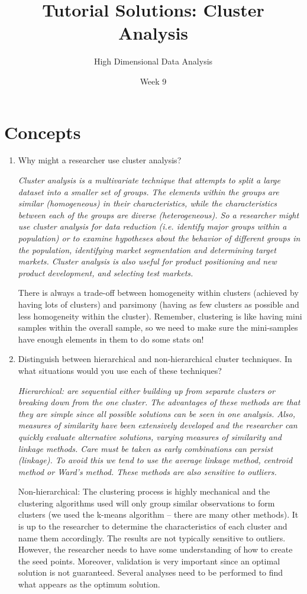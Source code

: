 \documentclass{article}
\title{Tutorial Solutions: Cluster Analysis}
\author{High Dimensional Data Analysis}
\date{Week 9}
\begin{document}
\maketitle
\section*{Concepts}
\begin{enumerate}
  \item Why might a researcher use cluster analysis?
  {\em
  Cluster analysis is a multivariate technique that attempts to split a large dataset into a smaller set of groups. The elements within the groups are similar (homogeneous) in their characteristics, while the characteristics between each of the groups are diverse (heterogeneous).  So a researcher might use cluster analysis for data reduction (i.e. identify major groups within a population) or to examine hypotheses about the behavior of different groups in the population, identifying market segmentation and determining target markets. Cluster analysis is also useful for product positioning and new product development, and selecting test markets.
  
  There is always a trade-off between homogeneity within clusters (achieved by having lots of clusters) and parsimony (having as few clusters as possible and less homogeneity within the cluster).   Remember, clustering is like having mini samples within the overall sample, so we need to make sure the mini-samples have enough elements in them to do some stats on!	 
  }
  \item Distinguish between hierarchical and non-hierarchical cluster techniques. In what situations would you use each of these techniques?
  {\em
  Hierarchical: are sequential either building up from separate clusters or breaking down from the one cluster.  The advantages of these methods are that they are simple since all possible solutions can be seen in one analysis.  Also, measures of similarity have been extensively developed and the researcher can quickly evaluate alternative solutions, varying measures of similarity and 	linkage methods.  Care must be taken as early combinations can persist (linkage).  To avoid this we tend to use the average linkage method, centroid method or Ward’s method.  These methods are also sensitive to outliers.
  
  
  Non-hierarchical: The clustering process is highly mechanical and the clustering algorithms used will only group similar observations to form clusters (we used the k-means algorithm – there are many other methods).  It is up to the researcher to determine the characteristics of each cluster and name them accordingly.  The results are not typically sensitive to outliers.  However, the researcher needs to have some understanding of how to create the seed points.  Moreover, validation is very important since an optimal solution is not guaranteed.  Several analyses need to be performed to find what appears as the optimum solution.
  
}
\end{enumerate}
\end{document}
